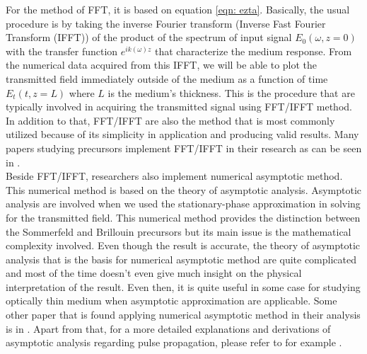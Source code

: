 For the method of FFT, it is based on equation \ref{eqn: ezta}. Basically, the usual procedure is by taking the inverse Fourier transform (Inverse Fast Fourier Transform (IFFT)) of the product of the spectrum of input signal $E_{0}(\omega, z = 0)$ with the transfer function $e^{i k(\omega) z}$ that characterize the medium response. From the numerical data acquired from this IFFT, we will be able to plot the transmitted field immediately outside of the medium as a function of time $E_{t}(t, z = L)$ where $L$ is the medium's thickness. This is the procedure that are typically involved in acquiring the transmitted signal using FFT/IFFT method. In addition to that, FFT/IFFT are also the method that is most commonly utilized because of its simplicity in application and producing valid results. Many papers studying precursors implement FFT/IFFT in their research as can be seen in \cite{Chen2010, Macke2013, MacKe2009, Oughstun2010, Wei2009, Jeong2008, Jeong2010}.\\

Beside FFT/IFFT, researchers also implement numerical asymptotic method. This numerical method is based on the theory of asymptotic analysis. Asymptotic analysis are involved when we used the stationary-phase approximation in solving for the transmitted field. This numerical method provides the distinction between the Sommerfeld and Brillouin precursors but its main issue is the mathematical complexity involved. Even though the result is accurate, the theory of asymptotic analysis that is the basis for numerical asymptotic method are quite complicated and most of the time doesn't even give much insight on the physical interpretation of the result. Even then, it is quite useful in some case for studying optically thin medium when asymptotic approximation are applicable. Some other paper that is found applying numerical asymptotic method in their analysis is in \cite{Jeong2009}. Apart from that, for a more detailed explanations and derivations of asymptotic analysis regarding pulse propagation, please refer to for example \cite{Oughstun2019}.

